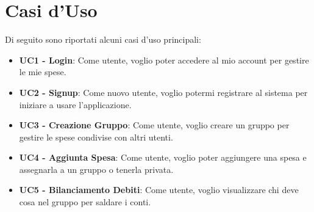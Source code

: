 \section{Casi d'Uso}
Di seguito sono riportati alcuni casi d'uso principali:
\begin{itemize}
    \item \textbf{UC1 - Login}: Come utente, voglio poter accedere al mio account per gestire le mie spese.
    \item \textbf{UC2 - Signup}: Come nuovo utente, voglio potermi registrare al sistema per iniziare a usare l'applicazione.
    \item \textbf{UC3 - Creazione Gruppo}: Come utente, voglio creare un gruppo per gestire le spese condivise con altri utenti.
    \item \textbf{UC4 - Aggiunta Spesa}: Come utente, voglio poter aggiungere una spesa e assegnarla a un gruppo o tenerla privata.
    \item \textbf{UC5 - Bilanciamento Debiti}: Come utente, voglio visualizzare chi deve cosa nel gruppo per saldare i conti.
\end{itemize}
